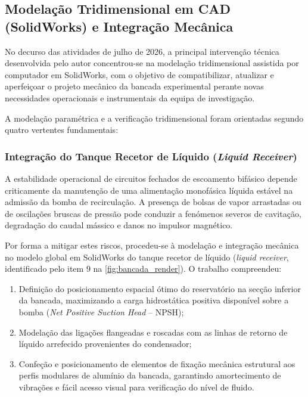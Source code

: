 \subsection{Modelação Tridimensional em CAD (SolidWorks\textregistered) e Integração Mecânica}
\label{subsec:cad_solidworks}

No decurso das atividades de julho de 2026, a principal intervenção técnica desenvolvida pelo autor concentrou-se na modelação tridimensional assistida por computador em SolidWorks\textregistered{}, com o objetivo de compatibilizar, atualizar e aperfeiçoar o projeto mecânico da bancada experimental perante novas necessidades operacionais e instrumentais da equipa de investigação.

A modelação paramétrica e a verificação tridimensional foram orientadas segundo quatro vertentes fundamentais:

\subsubsection{Integração do Tanque Recetor de Líquido (\emph{Liquid Receiver})}
\label{subsubsec:cad_liquid_receiver}

A estabilidade operacional de circuitos fechados de escoamento bifásico depende criticamente da manutenção de uma alimentação monofásica líquida estável na admissão da bomba de recirculação. A presença de bolsas de vapor arrastadas ou de oscilações bruscas de pressão pode conduzir a fenómenos severos de cavitação, degradação do caudal mássico e danos no impulsor magnético.

Por forma a mitigar estes riscos, procedeu-se à modelação e integração mecânica no modelo global em SolidWorks\textregistered{} do tanque recetor de líquido (\emph{liquid receiver}, identificado pelo item 9 na \autoref{fig:bancada_render}). O trabalho compreendeu:
\begin{enumerate}
    \item Definição do posicionamento espacial ótimo do reservatório na secção inferior da bancada, maximizando a carga hidrostática positiva disponível sobre a bomba (\emph{Net Positive Suction Head} -- NPSH);
    \item Modelação das ligações flangeadas e roscadas com as linhas de retorno de líquido arrefecido provenientes do condensador;
    \item Confeção e posicionamento de elementos de fixação mecânica estrutural aos perfis modulares de alumínio da bancada, garantindo amortecimento de vibrações e fácil acesso visual para verificação do nível de fluido.
\end{enumerate}

